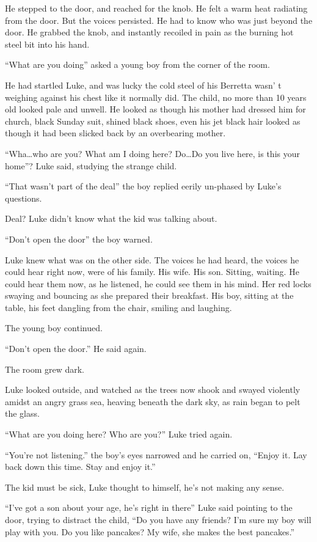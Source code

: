 He stepped to the door, and reached for the knob. He felt a warm heat
radiating from the door. But the voices persisted. He had to know who
was just beyond the door. He grabbed the knob, and instantly recoiled in
pain as the burning hot steel bit into his hand.

``What are you doing'' asked a young boy from the corner of the room.

He had startled Luke, and was lucky the cold steel of his Berretta wasn'
t weighing against his chest like it normally did. The child, no more
than 10 years old looked pale and unwell. He looked as though his mother
had dressed him for church, black Sunday suit, shined black shoes, even
his jet black hair looked as though it had been slicked back by an
overbearing mother.

``Wha\ldots who are you? What am I doing here? Do\ldots Do you live
here, is this your home''? Luke said, studying the strange child.

``That wasn't part of the deal'' the boy replied eerily un-phased by
Luke's questions.

Deal? Luke didn't know what the kid was talking about.

``Don't open the door'' the boy warned.

Luke knew what was on the other side. The voices he had heard, the
voices he could hear right now, were of his family. His wife. His
son. Sitting, waiting. He could hear them now, as he listened, he could
see them in his mind. Her red locks swaying and bouncing as she prepared
their breakfast. His boy, sitting at the table, his feet dangling from
the chair, smiling and laughing.

The young boy continued.

``Don't open the door.'' He said again.

The room grew dark.

Luke looked outside, and watched as the trees now shook and swayed
violently amidst an angry grass sea, heaving beneath the dark sky, as
rain began to pelt the glass.

``What are you doing here? Who are you?'' Luke tried again.

``You're not listening.'' the boy's eyes narrowed and he carried on,
``Enjoy it. Lay back down this time. Stay and enjoy it.''

The kid must be sick, Luke thought to himself, he's not making any
sense.

``I've got a son about your age, he's right in there'' Luke said
pointing to the door, trying to distract the child, ``Do you have any
friends? I'm sure my boy will play with you. Do you like pancakes? My
wife, she makes the best pancakes.''

